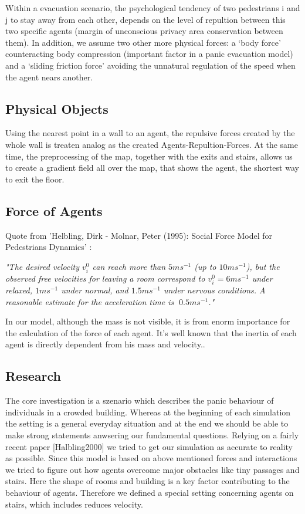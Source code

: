 \documentclass[11pt]{article}
\begin{document}
Within a evacuation scenario, the psychological tendency of two pedestrians i and j to stay away from each other, depends on the level of repultion between this two specific agents (margin of unconscious privacy area conservation between them). In addition, we assume two other more physical forces: a `body force' counteracting body compression (important factor in a panic evacuation model) and a `sliding friction force' avoiding the unnatural regulation of the speed when the agent nears another. 

\subsection*{Physical Objects}

Using the nearest point in a wall to an agent, the repulsive forces created by the whole wall is treaten analog as the created Agents-Repultion-Forces. At the same time, the preprocessing of the map, together with the exits and stairs, allows us to create a gradient field all over the map, that shows the agent, the shortest way to exit the floor. 



\subsection*{Force of Agents}

Quote from 'Helbling, Dirk - Molnar, Peter (1995): Social Force Model for Pedestrians Dynamics' \cite{SFMPD} :

\textit{"The desired velocity $v^0_i$ can reach more than $5 ms^{-1}$ (up to $10 m s^{-1}$), but the observed free velocities	for	leaving	a	room	correspond	to	$v^0_i=6 ms^{-1}$ under relaxed, $1ms^{-1}$ under normal, and $1.5ms^{-1}$ under nervous conditions. A reasonable estimate for the acceleration time is 􏰄$0.5ms^{-1}$."}

In our model, although the mass is not visible, it is from enorm importance for the calculation of the force of each agent. It's well known that the inertia of each agent is directly dependent from his mass and velocity..



\subsection{Research}

The core investigation is a szenario which describes the panic behaviour of individuals in a crowded building. Whereas at the beginning of each simulation the setting is a general everyday situation and at the end we should be able to make strong statements anwsering our fundamental questions.
Relying on a fairly recent paper [Halbling2000] we tried to get our simulation as accurate to reality as possible. Since this model is based on above mentioned forces and interactions we tried to figure out how agents overcome major obstacles like tiny passages and stairs. Here the shape of rooms and building is a key factor contributing to the behaviour of agents.
Therefore we defined a special setting concerning agents on stairs, which includes reduces velocity.
\end{document}
